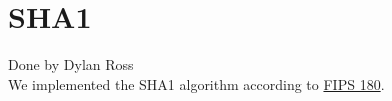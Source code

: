 \section{SHA1}\label{sec:sha}
Done by Dylan Ross\\

\medskip
We implemented the SHA1 algorithm according to \href{https://nvlpubs.nist.gov/nistpubs/FIPS/NIST.FIPS.180-4.pdf}{FIPS 180}.
